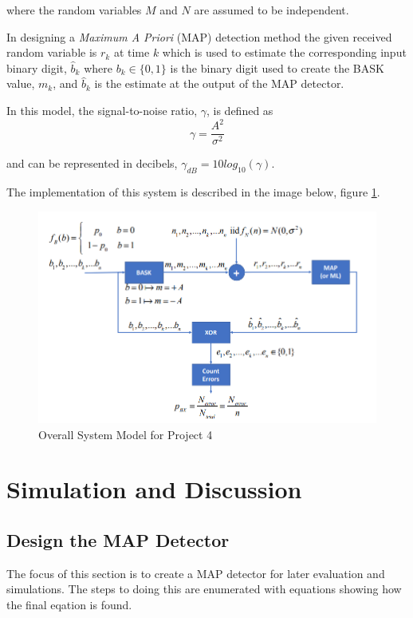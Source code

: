 \documentclass[a4paper, 11pt]{article}
\begin{document}
\noindent
where the random variables \(M\) and \(N\) are assumed to be independent.

\noindent
In designing a \emph{Maximum A Priori} (MAP) detection method the given received random variable is \(r_k\) at time \(k\) which is used to estimate the corresponding input binary digit, \(\hat b_k\) where \(b_k \in \{0,1\}\) is the binary digit used to create the BASK value, \(m_k\), and \(\hat b_k\) is the estimate at the output of the MAP detector.

\noindent
In this model, the signal-to-noise ratio, \(\gamma\), is defined as
\begin{equation}
\label{eqn:gamma}
    \gamma = \frac{A^2}{\sigma^2}
\end{equation}

\noindent
and can be represented in decibels, \(\gamma_{dB} = 10log_{10}(\gamma)\).

\medskip

The implementation of this system is described in the image below, figure \ref{fig:SystemModel}.

\begin{figure}[htbp]
\centering
\includegraphics[width=.9\linewidth]{./Images/SystemModel.png}
\caption{\label{fig:SystemModel}Overall System Model for Project 4}
\end{figure}

\section{Simulation and Discussion}
\label{sec:org9ae1e08}
\subsection{Design the MAP Detector}
\label{sec:orgd03c9fb}
The focus of this section is to create a MAP detector for later evaluation and simulations.
The steps to doing this are enumerated with equations showing how the final eqation is found.
\end{document}
